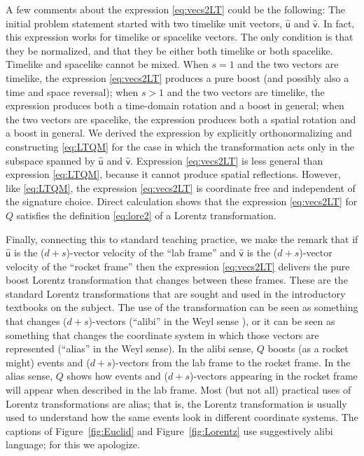\documentclass{article}
\newcommand{\Lhat}[1]{\hat{\mathsf{#1}}} %
\newcommand{\plus}{\!+\!} %
\newcommand{\figref}[1]{Figure~\ref{#1}}
\begin{document}
A few comments about the expression \eqref{eq:vecs2LT} could be the following:
The initial problem statement started with two timelike unit vectors, $\Lhat{u}$ and $\Lhat{v}$.
In fact, this expression works for timelike or spacelike vectors.
The only condition is that they be normalized, and that they be either both timelike or both spacelike.
Timelike and spacelike cannot be mixed.
When $s=1$ and the two vectors are timelike, the expression \eqref{eq:vecs2LT} produces a pure boost (and possibly also a time 
and space reversal);
when $s>1$ and the two vectors are timelike, the expression produces both a time-domain rotation and a boost in general;
when the two vectors are spacelike, the expression produces both a spatial rotation and a boost in general.
We derived the expression by explicitly orthonormalizing and constructing \eqref{eq:LTQM} for the case in which the transformation acts only in the subspace spanned by $\Lhat{u}$ and $\Lhat{v}$.
Expression \eqref{eq:vecs2LT} is less general than expression \eqref{eq:LTQM}, because it cannot produce spatial reflections.
However, like \eqref{eq:LTQM}, the expression \eqref{eq:vecs2LT} is coordinate free and independent of the signature choice.
Direct calculation shows that the expression \eqref{eq:vecs2LT} for $Q$ satisfies the definition \eqref{eq:lore2} of a Lorentz transformation.

Finally, connecting this to standard teaching practice, we make the remark that if $\Lhat{u}$ is the ($d\plus s$)-vector velocity of the ``lab frame'' and $\Lhat{v}$ is the ($d\plus s$)-vector velocity of the ``rocket frame'' then the expression \eqref{eq:vecs2LT} delivers the pure boost Lorentz transformation that changes between these frames.
These are the standard Lorentz transformations that are sought and used in the introductory textbooks on the subject.
The use of the transformation can be seen as something that changes ($d\plus s$)-vectors (``alibi'' in the Weyl sense \cite{weyl}),
or it can be seen as something that changes the coordinate system in which those vectors are represented (``alias'' in the Weyl sense).
In the alibi sense, $Q$ boosts (as a rocket might) events and ($d\plus s$)-vectors from the lab frame to the rocket frame.
In the alias sense, $Q$ shows how events and ($d\plus s$)-vectors appearing in the rocket frame will appear when described in the lab frame.
Most (but not all) practical uses of Lorentz transformations are alias;
that is, the Lorentz transformation is usually used to understand how the same events look in different coordinate systems.
The captions of \figref{fig:Euclid} and \figref{fig:Lorentz} use suggestively alibi language; for this we apologize.
\end{document}
